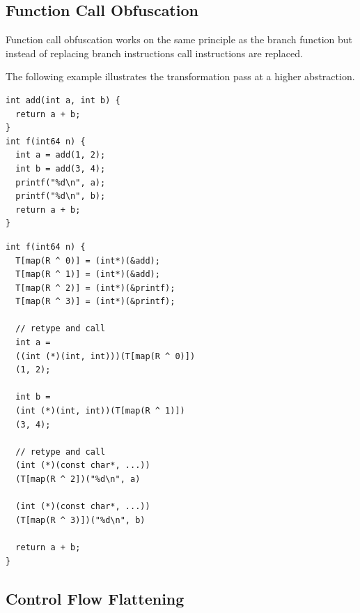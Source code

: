 \subsection{Function Call Obfuscation}

Function call obfuscation works on the same principle as the branch function but instead of replacing branch instructions
call instructions are replaced.

The following example illustrates the transformation pass at a higher abstraction.

\lstset{language=C++} %
\lstset{basicstyle=\ttfamily} %
\begin{lstlisting}
int add(int a, int b) {
  return a + b;
}
int f(int64 n) {
  int a = add(1, 2);
  int b = add(3, 4);
  printf("%d\n", a);
  printf("%d\n", b);
  return a + b;
}
\end{lstlisting}

\lstset{language=C++} %
\lstset{basicstyle=\ttfamily} %
\begin{lstlisting}
int f(int64 n) {
  T[map(R ^ 0)] = (int*)(&add);
  T[map(R ^ 1)] = (int*)(&add);
  T[map(R ^ 2)] = (int*)(&printf);
  T[map(R ^ 3)] = (int*)(&printf);

  // retype and call
  int a =
  ((int (*)(int, int)))(T[map(R ^ 0)])
  (1, 2);

  int b =
  (int (*)(int, int))(T[map(R ^ 1)])
  (3, 4);

  // retype and call
  (int (*)(const char*, ...))
  (T[map(R ^ 2])("%d\n", a)

  (int (*)(const char*, ...))
  (T[map(R ^ 3)])("%d\n", b)

  return a + b;
}
\end{lstlisting}

\subsection{Control Flow Flattening}
